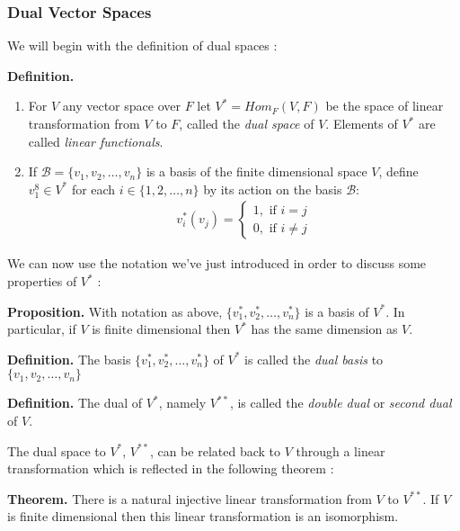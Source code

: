 \documentclass[11pt, reqno]{amsart}
\theoremstyle{plain}
\theoremstyle{definition}
\theoremstyle{example}
\begin{document}
\subsubsection{Dual Vector Spaces}

We will begin with the definition of dual spaces \cite[\S 11.3, p. 431]{dummit}:

\par
\textbf{Definition.}
\begin{enumerate}
\item For $V$ any vector space over $F$ let $V^* = Hom_F(V,F)$ be the space of linear transformation from $V$ to $F$, called the \textit{dual space} of $V$. Elements of $V^*$ are called \textit{linear functionals}.
\item If $\mathcal{B} = \{v_1, v_2, \ldots, v_n\}$ is a basis of the finite dimensional space $V$, define $v_1^8 \in V^*$ for each $i \in \{1, 2, \ldots, n\}$ by its action on the basis $\mathcal{B}$:
\begin{align*}
v_i^*(v_j) = \begin{cases} 
      1, \text{ if } i = j \\
      0, \text{ if } i \neq j 
   \end{cases}
\end{align*}
\end{enumerate}

We can now use the notation we've just introduced in order to discuss some properties of $V^*$ \cite[\S 11.3, p. 432]{dummit}:

\par
\textbf{Proposition.} With notation as above, $\{v_1^*, v_2^*, \ldots, v_n^*\}$ is a basis of $V^*$. In particular, if $V$ is finite dimensional then $V^*$ has the same dimension as $V$.

\par
\textbf{Definition.} The basis $\{v_1^*, v_2^*, \ldots, v_n^*\}$ of $V^*$ is called the \textit{dual basis} to $\{v_1, v_2, \ldots, v_n\}$

\par
\textbf{Definition.} The dual of $V^*$, namely $V^{**}$, is called the \textit{double dual} or \textit{second dual} of $V$.

The dual space to $V^*$, $V^{**}$, can be related back to $V$ through a linear transformation which is reflected in the following theorem \cite[\S 11.3, p. 433]{dummit}:

\par
\textbf{Theorem.} There is a natural injective linear transformation from $V$ to $V^{**}$. If $V$ is finite dimensional then this linear transformation is an isomorphism.
\end{document}
